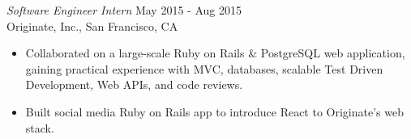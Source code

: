 {\sl Software Engineer Intern} \hfill May 2015 - Aug 2015 \\
Originate, Inc., San Francisco, CA
\begin{itemize} \itemsep -2pt %
  \item Collaborated on a large-scale Ruby on Rails \& PostgreSQL web
          application, gaining practical experience with MVC, databases,
          scalable Test Driven Development, Web APIs, and code reviews.
  \item Built social media Ruby on Rails app to introduce React to Originate's
          web stack.
\end{itemize}
